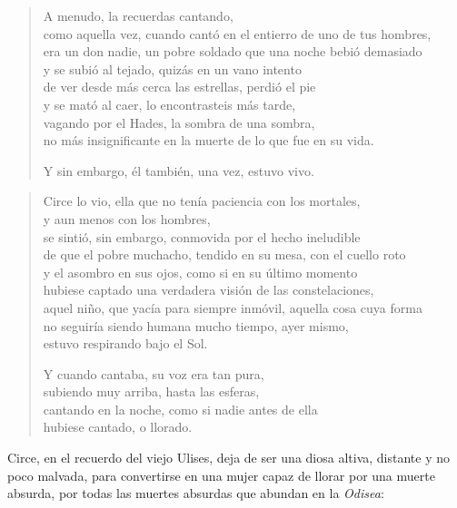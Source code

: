 \documentclass[11pt,a4paper]{article}
\begin{document}
\begin{verse}
A menudo, la recuerdas cantando,\\
como aquella vez, cuando cantó en el entierro de uno de tus hombres,\\
era un don nadie, un pobre soldado que una noche bebió demasiado\\
y se subió al tejado, quizás en un vano intento\\
de ver desde más cerca las estrellas, perdió el pie\\
y se mató al caer, lo encontrasteis más tarde,\\
vagando por el Hades, la sombra de una sombra,\\
no más insignificante en la muerte de lo que fue en su vida.

Y sin embargo, él también, una vez, estuvo vivo.
\end{verse}

\begin{verse}
Circe lo vio, ella que no tenía paciencia con los mortales,\\
y aun menos con los hombres,\\
se sintió, sin embargo, conmovida por el hecho ineludible\\
de que el pobre muchacho, tendido en su mesa, con el cuello roto\\
y el asombro en sus ojos, como si en su último momento\\
hubiese captado una verdadera visión de las constelaciones,\\
aquel niño, que yacía para siempre inmóvil, aquella cosa cuya forma\\
no seguiría siendo humana mucho tiempo, ayer mismo,\\
estuvo respirando bajo el Sol.

Y cuando cantaba, su voz era tan pura,\\
subiendo muy arriba, hasta las esferas,\\
cantando en la noche, como si nadie antes de ella\\
hubiese cantado, o llorado.
\end{verse}

Circe, en el recuerdo del viejo Ulises, deja de ser una diosa altiva, distante y no poco malvada, para convertirse en una mujer capaz de llorar por una muerte absurda, por todas las muertes absurdas que abundan en la \emph{Odisea}:
\end{document}
